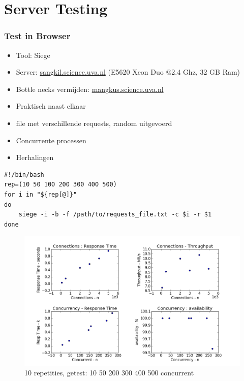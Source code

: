 \documentclass[10pt,a4paper]{beamer}
\begin{document}
\section{Server Testing}
\begin{frame}[fragile]
\frametitle{Test in Browser}
\begin{itemize}
\item Tool: Siege
\item Server: \url{sangkil.science.uva.nl} (E5620 Xeon Duo @2.4 Ghz, 32 GB Ram)
\item Bottle necks vermijden: \url{mangkus.science.uva.nl}
\item Praktisch naast elkaar
\item file met verschillende requests, random uitgevoerd
\item Concurrente processen
\item Herhalingen
\end{itemize}
\begin{lstlisting}
#!/bin/bash
rep=(10 50 100 200 300 400 500)
for i in "${rep[@]}"
do
	siege -i -b -f /path/to/requests_file.txt -c $i -r $1
done
\end{lstlisting}
\end{frame}
\begin{frame}
\begin{figure}
\includegraphics[scale=0.4]{siege_10r.png}
\caption{10 repetities, getest: 10 50 200 300 400 500 concurrent}
\end{figure}
\end{frame}
\end{document}
